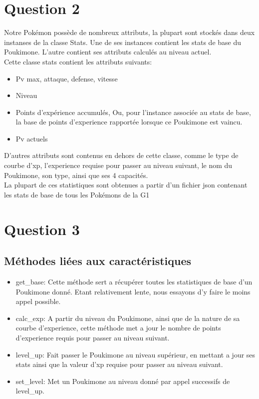 \documentclass{report}
\begin{document}
\section*{Question 2}
Notre Pokémon possède de nombreux attributs, la plupart sont stockés dans deux instanses de la classe Stats. Une de ses instances contient les stats de base du Poukimone. L'autre contient ses attributs calculés au niveau actuel.
\\Cette classe stats contient les attributs suivants:
\begin{itemize}
    \item{Pv max, attaque, defense, vitesse}
    \item{Niveau}
    \item{Points d'expérience accumulés, Ou, pour l'instance associée au stats de base, la base de points d'experience rapportée lorsque ce Poukimone est vaincu.}
    \item{Pv actuels}
\end{itemize}
D'autres attributs sont contenus en dehors de cette classe, comme le type de courbe d'xp, l'experience requise pour passer au niveau suivant, le nom du Poukimone, son type, ainsi que ses 4 capacités.
\\ La plupart de ces statistiques sont obtenues a partir d'un fichier json contenant les stats de base de tous les Pokémons de la G1
\section*{Question 3}
\subsection*{Méthodes liées aux caractéristiques}

\begin{itemize}
    \item{get\_base:}
        Cette méthode sert a récupérer toutes les statistiques de base d'un Poukimone donné. Etant relativement lente, nous essayons d'y faire le moins appel possible.\\
    \item{calc\_exp:}
        A partir du niveau du Poukimone, ainsi que de la nature de sa courbe d'experience, cette méthode met a jour le nombre de points d'experience requis pour passer au niveau suivant.\\
    \item{level\_up:}
        Fait passer le Poukimone au niveau supérieur, en mettant a jour ses stats ainsi que la valeur d'xp requise pour passer au niveau suivant.\\
    \item{set\_level:}
        Met un Poukimone au niveau donné par appel successifs de level\_up.
\end{itemize}
\end{document}

